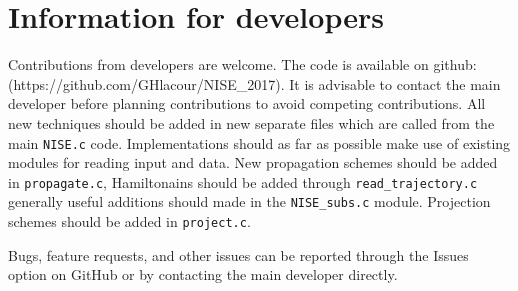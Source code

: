 \chapter{Information for developers\label{chap:developers}}
Contributions from developers are welcome. The code is available on
github:\\ (https://github.com/GHlacour/NISE\_2017). It is advisable to contact the
main developer before planning contributions to avoid competing contributions.
All new techniques should be added in new separate files which are called from the
main {\tt NISE.c} code. 
Implementations should as far as possible make use of existing modules for reading
input and data. New propagation schemes should be added in {\tt propagate.c},
Hamiltonains should be added through {\tt read\_trajectory.c} generally useful
additions should made in the {\tt NISE\_subs.c} module. Projection schemes should be
added in {\tt project.c}.

Bugs, feature requests, and other issues can be reported through the Issues option
on GitHub or by contacting the main developer directly.
